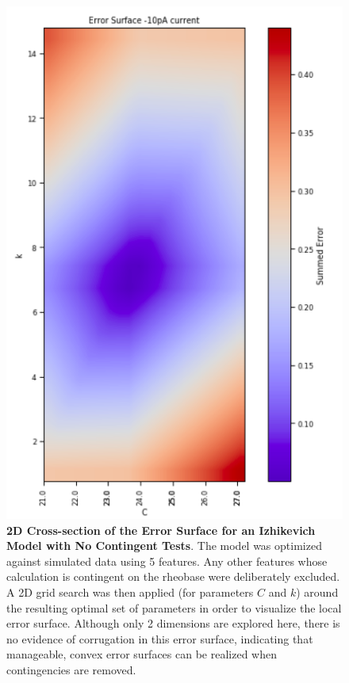 \begin{figure}
    \centering
    \includegraphics[scale=0.7]{figures/friendly_error_surface.png}
    \caption[Constant Currents Produce Tractable Error Surfaces]{\textbf{2D Cross-section of the Error Surface for an Izhikevich Model with No Contingent Tests}.
    The model was optimized against simulated data using 5 features.
    Any other features whose calculation is contingent on the rheobase were deliberately excluded.
    A 2D grid search was then applied (for parameters $C$ and $k$) around the resulting optimal set of parameters in order to visualize the local error surface.
    Although only 2 dimensions are explored here, there is no evidence of corrugation in this error surface, indicating that manageable, convex error surfaces can be realized when contingencies are removed.}
    \label{fig:constant_current}
\end{figure}

